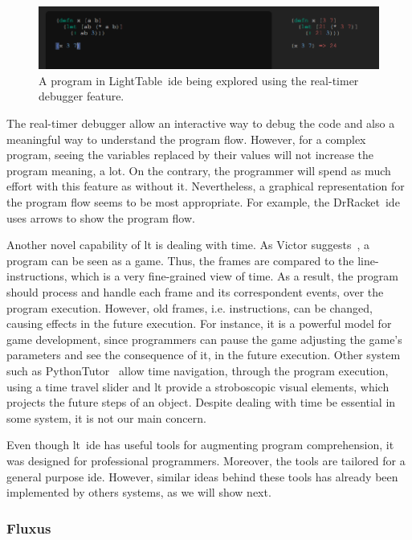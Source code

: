 \begin{figure}[!htbp]
  \centering
  \includegraphics[width=1.0\textwidth,height=0.1\textheight]{img/lt1}
    \caption{A program in LightTable~\ac{ide} being explored using the real-timer debugger feature.}  
  \label{fig:lt2}
\end{figure}

The real-timer debugger allow an interactive way to debug the code and also a meaningful way to understand the program flow. However, for a complex program, seeing the variables replaced by their values will not increase the program meaning, a lot. On the contrary, the programmer will spend as much effort with this feature as without it. Nevertheless, a graphical representation for the program flow seems to be most appropriate. For example, the DrRacket~\ac{ide}~\cite{findler2002drscheme} uses arrows to show the program flow.

Another novel capability of \ac{lt} is dealing with time. As Victor suggests~\cite{learnableProg}, a program can be seen as a game. Thus, the frames are compared to the line-instructions, which is a very fine-grained view of time. As a result, the program should process and handle each frame and its correspondent events, over the program execution. However, old frames, i.e. instructions, can be changed, causing effects in the future execution. For instance, it is a powerful model for game development, since programmers can pause the game adjusting the game's parameters and see the consequence of it, in the future execution. Other system such as PythonTutor~\cite{GuoSIGCSE2013} allow time navigation, through the program execution, using a time travel slider and \ac{lt} provide a stroboscopic visual elements, which projects the future steps of an object. Despite dealing with time be essential in some system, it is not our main concern.

Even though \ac{lt}~\ac{ide} has useful tools for augmenting program comprehension, it was designed for professional programmers. Moreover, the tools are tailored for a general purpose \ac{ide}. However, similar ideas behind these tools has already been implemented by others systems, as we will show next.

\subsubsection{Fluxus}

